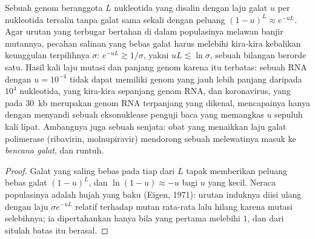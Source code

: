 \begin{proposition}\label{prop:b3:virology:error-threshold}
Sebuah genom beranggota $L$ nukleotida yang disalin dengan laju galat $u$ per
nukleotida tersalin tanpa galat sama sekali dengan peluang
$(1-u)^{L} \approx e^{-uL}$. Agar urutan yang terbugar bertahan di dalam
populasinya melawan banjir mutannya, pecahan salinan yang bebas galat harus
melebihi kira-kira kebalikan keunggulan terpilihnya $\sigma$: $e^{-uL} \gtrsim
1/\sigma$, yakni $uL \lesssim \ln\sigma$, sebuah bilangan berorde satu. Hasil
kali laju mutasi dan panjang genom karena itu terbatas: sebuah  RNA
dengan $u = 10^{-4}$ tidak dapat memiliki genom yang jauh lebih panjang
daripada $10^{4}$ nukleotida, yang kira-kira sepanjang genom  RNA, dan
koronavirus, yang pada \qty{30}{kb} merupakan genom RNA terpanjang yang
dikenal, mencapainya hanya dengan menyandi sebuah eksonuklease penguji baca
yang memangkas $u$ sepuluh kali lipat. Ambangnya juga sebuah senjata: obat yang
menaikkan laju galat polimerase (ribavirin, molnupiravir) mendorong sebuah
 melewatinya masuk ke \emph{bencana galat}, dan  runtuh.
\end{proposition}
\begin{proof}
Galat yang saling bebas pada tiap dari $L$ tapak memberikan peluang bebas galat
$(1-u)^{L}$, dan $\ln(1-u) \approx -u$ bagi $u$ yang kecil. Neraca
populasinya adalah hujah  yang baku (Eigen, 1971): urutan induknya
diisi ulang dengan laju $\sigma e^{-uL}$ relatif terhadap mutan rata-rata
lalu hilang karena mutasi selebihnya; ia dipertahankan hanya bila yang
pertama melebihi $1$, dan dari situlah batas itu berasal.
\end{proof}

